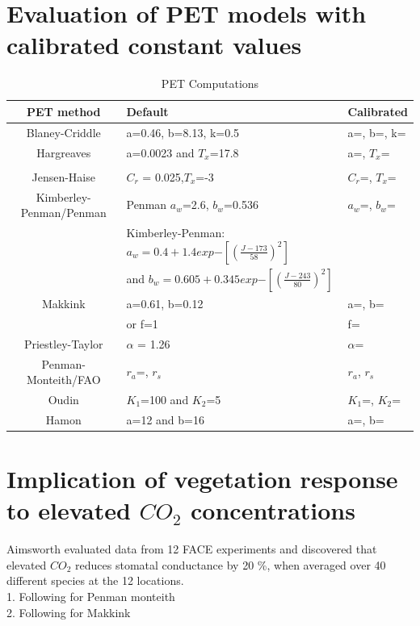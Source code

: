 \documentclass[hydrology,article,submit,moreauthors,pdftex]{Definitions/mdpi}
\begin{document}
\section{Evaluation of PET models with calibrated constant values}
\begin{table}[H]
	\centering
	\caption{PET Computations}
	\begin{tabular}{c|ll}
		\toprule
		\textbf{PET method}	&  \textbf{Default} & \textbf{Calibrated} \\ \midrule
		Blaney-Criddle \cite{blaney1950determining}& a=0.46, b=8.13, k=0.5  & a=, b=, k= \\
		Hargreaves \cite{hargreaves1975moisture} & a=0.0023 and $T_x$=17.8 & a=, $T_x$= \\
		 \\
		Jensen-Haise & $C_r$ = 0.025,$T_x$=-3 & $C_r$=, $ T_x$= \\
		Kimberley-Penman/Penman & Penman $a_w$=2.6, $b_w$=0.536 & $a_w$=, $b_w$=\\
		& Kimberley-Penman:  $a_w = 0.4 + 1.4 exp{-\left[\left(\frac{J-173}{58}\right)^2\right]}$ \\
		& and $b_w = 0.605 + 0.345 exp{-\left[\left(\frac{J-243}{80}\right)^2\right]}$ \\
		Makkink \cite{makkink1957testing} & a=0.61, b=0.12 & a=, b=\\
		& or f=1 & f= \\ 	
		Priestley-Taylor \cite{priestley1972assessment} & $\alpha$ = 1.26 & $\alpha$=\\
		Penman-Monteith/FAO \cite{asce2005asce} & $r_a$=, $r_s$ & $r_a$, $r_s$\\
		Oudin \cite{oudin2005potential} &  $K_1$=100 and $K_2$=5 & $K_1$=, $K_2$=\\
		Hamon \cite{oudin2005potential} & a=12 and b=16 & a=, b= 
	\end{tabular}
\end{table}

\section{Implication of vegetation response to elevated $CO_2$ concentrations}
Aimsworth\cite{ainsworth2005have} evaluated data from 12 FACE experiments and discovered that elevated $CO_2$ reduces stomatal conductance by 20 \%, when averaged over 40 different species at the 12 locations. \\
1. Following \cite{yang2019hydrologic} for Penman monteith \\
2. Following \cite{kruijt2008effects} for Makkink \\
\end{document}
